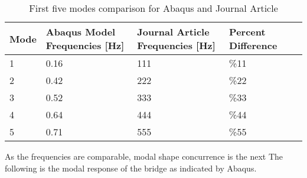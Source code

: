 \begin{table}
\begin{tabular}{|l|l|l|l|l|}
\hline
Mode & Abaqus Model Frequencies [Hz] & Journal Article Frequencies [Hz] & Percent Difference &  \\
\hline
1    & 0.16                          & 111                              & \%11               &  \\
2    & 0.42                          & 222                              & \%22               &  \\
3    & 0.52                          & 333                              & \%33               &  \\
4    & 0.64                          & 444                              & \%44               &  \\
5    & 0.71                          & 555                              & \%55               &  \\
\hline
\end{tabular}
\caption{First five modes comparison for Abaqus and Journal Article}
\label{tab:FirstFive}
\end{table}

As the frequencies are comparable, modal shape concurrence is the next  
The following is the modal response of the bridge as indicated by Abaqus. 
